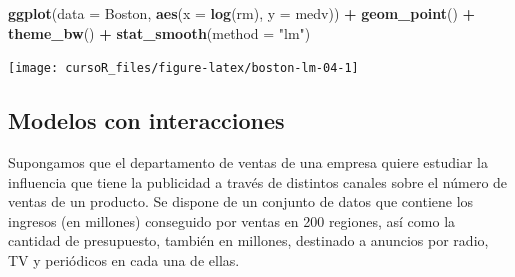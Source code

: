 \documentclass[]{book}
\newenvironment{Shaded}{\begin{snugshade}}{\end{snugshade}}
\newcommand{\KeywordTok}[1]{\textcolor[rgb]{0.13,0.29,0.53}{\textbf{#1}}}
\newcommand{\DataTypeTok}[1]{\textcolor[rgb]{0.13,0.29,0.53}{#1}}
\newcommand{\StringTok}[1]{\textcolor[rgb]{0.31,0.60,0.02}{#1}}
\newcommand{\OperatorTok}[1]{\textcolor[rgb]{0.81,0.36,0.00}{\textbf{#1}}}
\newcommand{\NormalTok}[1]{#1}
\begin{document}
\begin{Shaded}
\begin{Highlighting}[]
\KeywordTok{ggplot}\NormalTok{(}\DataTypeTok{data =}\NormalTok{ Boston, }\KeywordTok{aes}\NormalTok{(}\DataTypeTok{x =} \KeywordTok{log}\NormalTok{(rm), }\DataTypeTok{y =}\NormalTok{ medv)) }\OperatorTok{+}
\StringTok{  }\KeywordTok{geom_point}\NormalTok{() }\OperatorTok{+}
\StringTok{  }\KeywordTok{theme_bw}\NormalTok{() }\OperatorTok{+}\StringTok{ }
\StringTok{  }\KeywordTok{stat_smooth}\NormalTok{(}\DataTypeTok{method =} \StringTok{"lm"}\NormalTok{)}
\end{Highlighting}
\end{Shaded}

\begin{center}\texttt{[image: cursoR\_files/figure-latex/boston-lm-04-1]} \end{center}

\subsection{Modelos con interacciones}\label{modelos-con-interacciones}

Supongamos que el departamento de ventas de una empresa quiere estudiar
la influencia que tiene la publicidad a través de distintos canales
sobre el número de ventas de un producto. Se dispone de un conjunto de
datos que contiene los ingresos (en millones) conseguido por ventas en
200 regiones, así como la cantidad de presupuesto, también en millones,
destinado a anuncios por radio, TV y periódicos en cada una de ellas.
\end{document}
